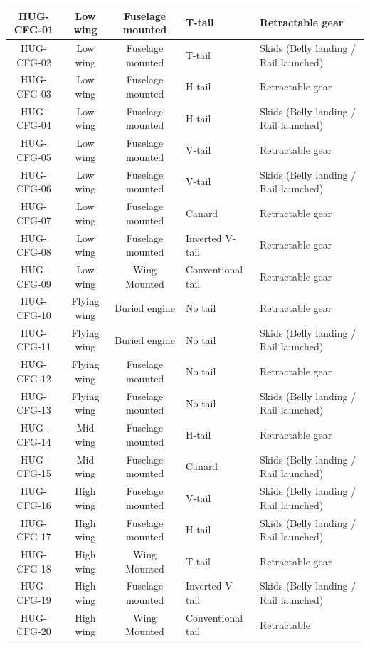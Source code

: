 \begin{longtable}{|c|c|c|p{2.5cm}|p{4.5cm}|}
    HUG-CFG-01 & Low wing & Fuselage mounted & T-tail & Retractable gear \\
    \hline
    HUG-CFG-02 & Low wing & Fuselage mounted & T-tail & Skids (Belly landing / Rail launched) \\
    \hline
    HUG-CFG-03 & Low wing & Fuselage mounted & H-tail & Retractable gear \\
    \hline
    HUG-CFG-04 & Low wing & Fuselage mounted & H-tail & Skids (Belly landing / Rail launched) \\
    \hline
    HUG-CFG-05 & Low wing & Fuselage mounted & V-tail & Retractable gear \\
    \hline
    HUG-CFG-06 & Low wing & Fuselage mounted & V-tail & Skids (Belly landing / Rail launched) \\
    \hline
    HUG-CFG-07 & Low wing & Fuselage mounted & Canard & Retractable gear \\
    \hline
    HUG-CFG-08 & Low wing & Fuselage mounted & Inverted V-tail & Retractable gear \\
    \hline
    HUG-CFG-09 & Low wing & Wing Mounted & Conventional tail & Retractable gear \\
    \hline
    HUG-CFG-10 & Flying wing & Buried engine & No tail & Retractable gear \\
    \hline
    HUG-CFG-11 & Flying wing & Buried engine & No tail & Skids (Belly landing / Rail launched) \\
    \hline
    HUG-CFG-12 & Flying wing & Fuselage mounted & No tail & Retractable gear \\
    \hline
    HUG-CFG-13 & Flying wing & Fuselage mounted & No tail & Skids (Belly landing / Rail launched) \\
    \hline
    HUG-CFG-14 & Mid wing & Fuselage mounted & H-tail & Retractable gear \\
    \hline
    HUG-CFG-15 & Mid wing & Fuselage mounted & Canard & Skids (Belly landing / Rail launched) \\
    \hline
    HUG-CFG-16 & High wing & Fuselage mounted & V-tail & Skids (Belly landing / Rail launched) \\
    \hline
    HUG-CFG-17 & High wing & Fuselage mounted & H-tail & Skids (Belly landing / Rail launched) \\
    \hline
    HUG-CFG-18 & High wing & Wing Mounted & T-tail & Retractable gear \\
    \hline
    HUG-CFG-19 & High wing & Fuselage mounted & Inverted V-tail & Skids (Belly landing / Rail launched) \\
    \hline
    HUG-CFG-20 & High wing & Wing Mounted & Conventional tail & Retractable \\
    \hline

\end{longtable}